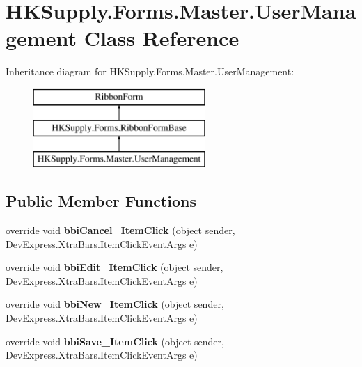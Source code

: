 \hypertarget{class_h_k_supply_1_1_forms_1_1_master_1_1_user_management}{}\section{H\+K\+Supply.\+Forms.\+Master.\+User\+Management Class Reference}
\label{class_h_k_supply_1_1_forms_1_1_master_1_1_user_management}
Inheritance diagram for H\+K\+Supply.\+Forms.\+Master.\+User\+Management\+:\begin{figure}[H]
\begin{center}
\leavevmode
\includegraphics[height=3.000000cm]{class_h_k_supply_1_1_forms_1_1_master_1_1_user_management}
\end{center}
\end{figure}
\subsection*{Public Member Functions}
\begin{DoxyCompactItemize}
\item 
\mbox{\label{class_h_k_supply_1_1_forms_1_1_master_1_1_user_management_a333537f209a865c88129f6cb731d04c7}} 
override void {\bfseries bbi\+Cancel\+\_\+\+Item\+Click} (object sender, Dev\+Express.\+Xtra\+Bars.\+Item\+Click\+Event\+Args e)
\item 
\mbox{\label{class_h_k_supply_1_1_forms_1_1_master_1_1_user_management_a42e75f35c50451a97a081cf6c519c4eb}} 
override void {\bfseries bbi\+Edit\+\_\+\+Item\+Click} (object sender, Dev\+Express.\+Xtra\+Bars.\+Item\+Click\+Event\+Args e)
\item 
\mbox{\label{class_h_k_supply_1_1_forms_1_1_master_1_1_user_management_a336715a44ac9d357a9fb64207d2f0d23}} 
override void {\bfseries bbi\+New\+\_\+\+Item\+Click} (object sender, Dev\+Express.\+Xtra\+Bars.\+Item\+Click\+Event\+Args e)
\item 
\mbox{\label{class_h_k_supply_1_1_forms_1_1_master_1_1_user_management_a691087c2437afe71e0fc1b2760905040}} 
override void {\bfseries bbi\+Save\+\_\+\+Item\+Click} (object sender, Dev\+Express.\+Xtra\+Bars.\+Item\+Click\+Event\+Args e)
\end{DoxyCompactItemize}
